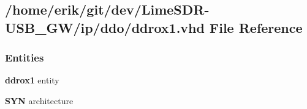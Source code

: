 \subsection{/home/erik/git/dev/\+Lime\+S\+D\+R-\/\+U\+S\+B\+\_\+\+G\+W/ip/ddo/ddrox1.vhd File Reference}
\label{ddrox1_8vhd}
\subsubsection*{Entities}
\begin{DoxyCompactItemize}
\item 
{\bf ddrox1} entity
\item 
{\bf S\+YN} architecture
\end{DoxyCompactItemize}
